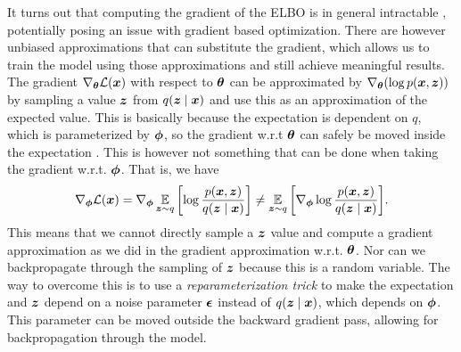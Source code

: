 It turns out that computing the gradient of the ELBO is in general intractable \cite{kingma2017variational}, potentially posing an issue with gradient based optimization. There are however unbiased approximations that can substitute the gradient, which allows us to train the model using those approximations and still achieve meaningful results. The gradient $\nabla_{\bm{ \theta }} \mathcal{L}(\bm{ x })$ with respect to $\bm{ \theta }$ can be approximated by $\nabla_{\bm{ \theta }}{\mathopen{} \left( \log p(\bm{ x }, \bm{ z }) \right) \mathclose{}}$ by sampling a value $\bm{ z }$ from $q(\bm{ z } \mid \bm{ x })$ and use this as an approximation of the expected value. This is basically because the expectation is dependent on $q$, which is parameterized by $\bm{ \phi }$, so the gradient w.r.t $\bm{ \theta }$ can safely be moved inside the expectation . This is however not something that can be done when taking the gradient w.r.t. $\bm{ \phi }$. That is, we have
\[ \nabla_{\bm{ \phi }}\mathcal{L}(\bm{ x }) = \nabla_{\bm{ \phi }} \operatorname*{\mathbb{E}}_{\bm{ z }\sim q}{\mathopen{} \left[ \log \frac{p(\bm{ x }, \bm{ z })}{q(\bm{ z } \mid \bm{ x })} \right] \mathclose{}} \neq \operatorname*{\mathbb{E}}_{\bm{ z }\sim q}{\mathopen{} \left[ \nabla_{\bm{ \phi }} \log \frac{p(\bm{ x }, \bm{ z })}{q(\bm{ z } \mid \bm{ x })} \right] \mathclose{}}. \]
This means that we cannot directly sample a $\bm{ z }$ value and compute a gradient approximation as we did in the gradient approximation w.r.t. $\bm{ \theta }$. Nor can we backpropagate through the sampling of $\bm{ z }$ because this is a random variable. The way to overcome this is to use a \textit{reparameterization trick} to make the expectation and $\bm{ z }$ depend on a noise parameter $\bm{ \epsilon }$ instead of $q(\bm{ z } \mid \bm{ x })$, which depends on $\bm{ \phi }$. This parameter can be moved outside the backward gradient pass, allowing for backpropagation through the model.

